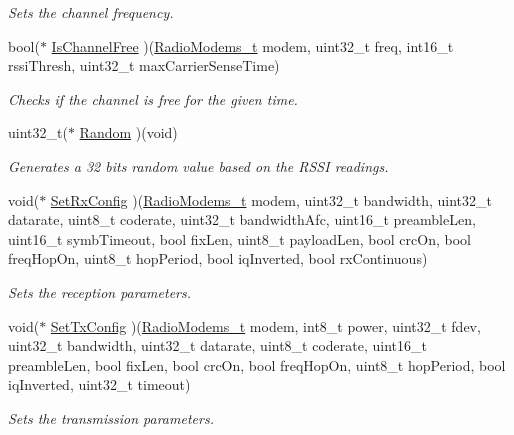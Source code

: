 \begin{DoxyCompactItemize}
\begin{DoxyCompactList}\small\item\em Sets the channel frequency. \end{DoxyCompactList}\item 
bool($\ast$ \hyperlink{group__LORA_ga9e6632b46872513fe063489eb22f9663}{Is\+Channel\+Free} )(\hyperlink{group__LORA_ga992ef7a5b7f52975ba7bd8dd97740057}{Radio\+Modems\+\_\+t} modem, uint32\+\_\+t freq, int16\+\_\+t rssi\+Thresh, uint32\+\_\+t max\+Carrier\+Sense\+Time)
\begin{DoxyCompactList}\small\item\em Checks if the channel is free for the given time. \end{DoxyCompactList}\item 
uint32\+\_\+t($\ast$ \hyperlink{group__LORA_gaf39c7ced02721092f0f780f6632a81fd}{Random} )(void)
\begin{DoxyCompactList}\small\item\em Generates a 32 bits random value based on the R\+S\+SI readings. \end{DoxyCompactList}\item 
void($\ast$ \hyperlink{group__LORA_gadd564d2a79027afbc6f0f8f3011fe93b}{Set\+Rx\+Config} )(\hyperlink{group__LORA_ga992ef7a5b7f52975ba7bd8dd97740057}{Radio\+Modems\+\_\+t} modem, uint32\+\_\+t bandwidth, uint32\+\_\+t datarate, uint8\+\_\+t coderate, uint32\+\_\+t bandwidth\+Afc, uint16\+\_\+t preamble\+Len, uint16\+\_\+t symb\+Timeout, bool fix\+Len, uint8\+\_\+t payload\+Len, bool crc\+On, bool freq\+Hop\+On, uint8\+\_\+t hop\+Period, bool iq\+Inverted, bool rx\+Continuous)
\begin{DoxyCompactList}\small\item\em Sets the reception parameters. \end{DoxyCompactList}\item 
void($\ast$ \hyperlink{group__LORA_gad4177124b5db6b2b1f07ba16e631bbdb}{Set\+Tx\+Config} )(\hyperlink{group__LORA_ga992ef7a5b7f52975ba7bd8dd97740057}{Radio\+Modems\+\_\+t} modem, int8\+\_\+t power, uint32\+\_\+t fdev, uint32\+\_\+t bandwidth, uint32\+\_\+t datarate, uint8\+\_\+t coderate, uint16\+\_\+t preamble\+Len, bool fix\+Len, bool crc\+On, bool freq\+Hop\+On, uint8\+\_\+t hop\+Period, bool iq\+Inverted, uint32\+\_\+t timeout)
\begin{DoxyCompactList}\small\item\em Sets the transmission parameters. \end{DoxyCompactList}\item 

\end{DoxyCompactItemize}

